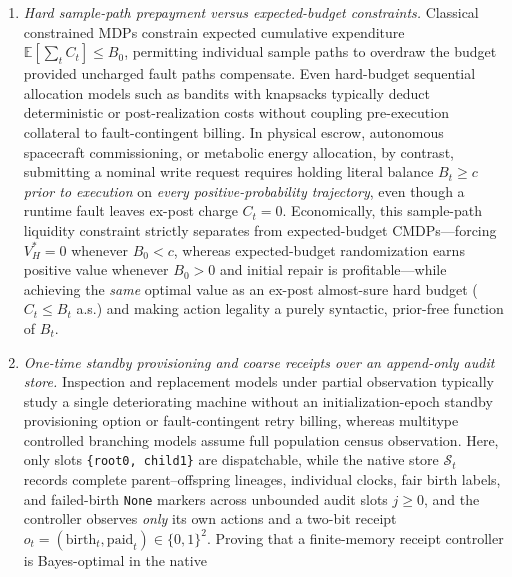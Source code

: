 \documentclass[11pt,a4paper]{article}
\providecommand{\tightlist}{\setlength{\itemsep}{2pt}\setlength{\parskip}{0pt}}
\begin{document}
\begin{enumerate}
\def\labelenumi{\arabic{enumi}.}
\tightlist
\item
  \emph{Hard sample-path prepayment versus expected-budget constraints.}
  Classical constrained MDPs \citep{altman1999, feinberg2000} constrain
  expected cumulative expenditure \(\mathbb{E}[\sum_t C_t] \le B_0\),
  permitting individual sample paths to overdraw the budget provided
  uncharged fault paths compensate. Even hard-budget sequential
  allocation models such as bandits with knapsacks
  \citep{badanidiyuru2018, besbesZeevi2009} typically deduct
  deterministic or post-realization costs without coupling pre-execution
  collateral to fault-contingent billing. In physical escrow, autonomous
  spacecraft commissioning, or metabolic energy allocation, by contrast,
  submitting a nominal write request requires holding literal balance
  \(B_t \ge c\) \emph{prior to execution} on \emph{every
  positive-probability trajectory}, even though a runtime fault leaves
  ex-post charge \(C_t = 0\). Economically, this sample-path liquidity
  constraint strictly separates from expected-budget CMDPs---forcing
  \(V_H^* = 0\) whenever \(B_0 < c\), whereas expected-budget
  randomization earns positive value whenever \(B_0 > 0\) and initial
  repair is profitable---while achieving the \emph{same} optimal value
  as an ex-post almost-sure hard budget (\(C_t \le B_t\) a.s.) and
  making action legality a purely syntactic, prior-free function of
  \(B_t\).
\item
  \emph{One-time standby provisioning and coarse receipts over an
  append-only audit store.} Inspection and replacement models under
  partial observation
  \citep{eckles1968, ross1970, ross1971, white1979, monahan1982, makisJiang2003}
  typically study a single deteriorating machine without an
  initialization-epoch standby provisioning option or fault-contingent
  retry billing, whereas multitype controlled branching models
  \citep{jagers1975, pliska1976, rothblumWhittle1982, haccou2005, gonzalez2018}
  assume full population census observation. Here, only slots
  \texttt{\{root0,\ child1\}} are dispatchable, while the native store
  \(\mathcal{S}_t\) records complete parent--offspring lineages,
  individual clocks, fair birth labels, and failed-birth \texttt{None}
  markers across unbounded audit slots \(j \ge 0\), and the controller
  observes \emph{only} its own actions and a two-bit receipt
  \(o_t = (\mathrm{birth}_t, \mathrm{paid}_t) \in \{0,1\}^2\). Proving
  that a finite-memory receipt controller is Bayes-optimal in the native

\end{enumerate}
\end{document}
